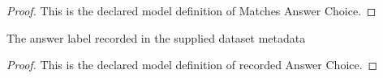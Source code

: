 \begin{proof}
  This is the declared model definition of Matches Answer Choice.
\end{proof}
\begin{definition}
  \label{def:physics:phyx-mini-0118:phyxminiproblems-problemphyxmini0118-recordedanswerchoice}
  The answer label recorded in the supplied dataset metadata
\end{definition}
\begin{proof}
  This is the declared model definition of recorded Answer Choice.
\end{proof}
